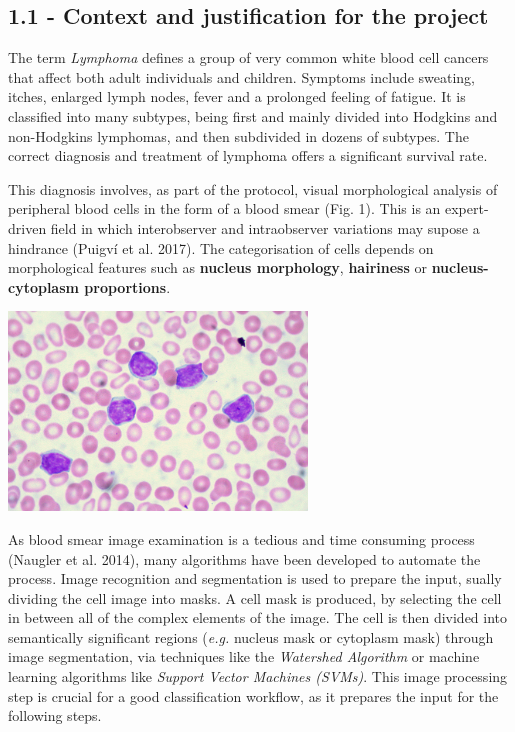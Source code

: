 \documentclass[]{article}
\let\origfigure\figure
\let\endorigfigure\endfigure
\renewenvironment{figure}[1][2] {
    \expandafter\origfigure\expandafter[H]
} {
    \endorigfigure
}
\begin{document}
\subsection{1.1 - Context and justification for the
project}\label{context-and-justification-for-the-project}

The term \emph{Lymphoma} defines a group of very common white blood cell
cancers that affect both adult individuals and children. Symptoms
include sweating, itches, enlarged lymph nodes, fever and a prolonged
feeling of fatigue. It is classified into many subtypes, being first and
mainly divided into Hodgkins and non-Hodgkins lymphomas, and then
subdivided in dozens of subtypes. The correct diagnosis and treatment of
lymphoma offers a significant survival rate.

This diagnosis involves, as part of the protocol, visual morphological
analysis of peripheral blood cells in the form of a blood smear (Fig.
1). This is an expert-driven field in which interobserver and
intraobserver variations may supose a hindrance (Puigv{í} et al. 2017).
The categorisation of cells depends on morphological features such as
\textbf{nucleus morphology}, \textbf{hairiness} or
\textbf{nucleus-cytoplasm proportions}.

\begin{figure}[h]

{\centering \includegraphics[width=1\linewidth,height=200px,]{./images/2-blood-smear} 

}

\caption{Microscopic image of blood smear containing lymphocytes (purple, with granulated nuclei) (Source: Euthman, https://www.flickr.com/photos/euthman/2869815349 )}\label{Fig. unnamed-chunk-1}
\end{figure}

As blood smear image examination is a tedious and time consuming process
(Naugler et al. 2014), many algorithms have been developed to automate
the process. Image recognition and segmentation is used to prepare the
input, sually dividing the cell image into masks. A cell mask is
produced, by selecting the cell in between all of the complex elements
of the image. The cell is then divided into semantically significant
regions (\emph{e.g.} nucleus mask or cytoplasm mask) through image
segmentation, via techniques like the \emph{Watershed Algorithm} or
machine learning algorithms like \emph{Support Vector Machines (SVMs)}.
This image processing step is crucial for a good classification
workflow, as it prepares the input for the following steps.
\end{document}
